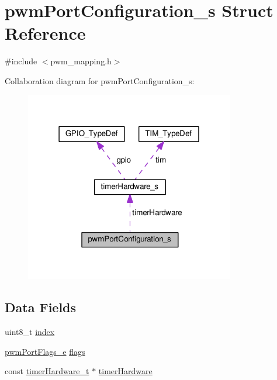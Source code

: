 \hypertarget{structpwmPortConfiguration__s}{\section{pwm\+Port\+Configuration\+\_\+s Struct Reference}
\label{structpwmPortConfiguration__s}
}


{\ttfamily \#include $<$pwm\+\_\+mapping.\+h$>$}



Collaboration diagram for pwm\+Port\+Configuration\+\_\+s\+:\nopagebreak
\begin{figure}[H]
\begin{center}
\leavevmode
\includegraphics[width=259pt]{structpwmPortConfiguration__s__coll__graph}
\end{center}
\end{figure}
\subsection*{Data Fields}
\begin{DoxyCompactItemize}
\item 
uint8\+\_\+t \hyperlink{structpwmPortConfiguration__s_a71daa6f7e466dddfa89e6368e6c39531}{index}
\item 
\hyperlink{pwm__mapping_8h_a15c752d143187357700cc18041d694cc}{pwm\+Port\+Flags\+\_\+e} \hyperlink{structpwmPortConfiguration__s_a85cd3c843dbc8e27d457bed975d43346}{flags}
\item 
const \hyperlink{timer_8h_a7a6521811f99a8d6a00ba58ba4b5ee57}{timer\+Hardware\+\_\+t} $\ast$ \hyperlink{structpwmPortConfiguration__s_a3bc6afc44c3547581f5ac2b4ed6df48f}{timer\+Hardware}
\end{DoxyCompactItemize}


